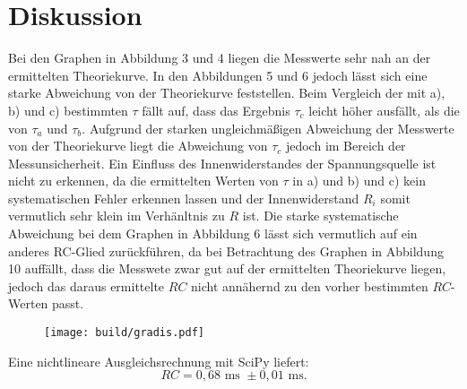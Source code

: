 \section{Diskussion}
\label{sec:Diskussion}\textbf{}
Bei den Graphen in Abbildung 3 und 4 liegen die Messwerte sehr nah an der ermittelten Theoriekurve. In den Abbildungen 5 und 6 jedoch lässt sich eine starke Abweichung von der Theoriekurve feststellen. Beim Vergleich der mit a), b) und c) bestimmten $\tau$ fällt auf, dass das Ergebnis $\tau_c$ leicht höher ausfällt, als die von $\tau_a$ und $\tau_b$. Aufgrund der starken ungleichmäßigen Abweichung der Messwerte von der Theoriekurve liegt die Abweichung von $\tau_c$ jedoch im Bereich der Messunsicherheit. Ein Einfluss des Innenwiderstandes der Spannungsquelle ist nicht zu erkennen, da die ermittelten Werten von $\tau$ in a) und b) und c) kein systematischen Fehler erkennen lassen und der Innenwiderstand $R_i$ somit vermutlich sehr klein im Verhänltnis zu $R$ ist. Die starke systematische Abweichung bei dem Graphen in Abbildung 6 lässt sich vermutlich auf ein anderes RC-Glied zurückführen, da bei Betrachtung des Graphen in Abbildung 10 auffällt, dass die Messwete zwar gut auf der ermittelten Theoriekurve liegen, jedoch das daraus ermittelte $RC$ nicht annähernd zu den vorher bestimmten $RC$-Werten passt.
\begin{figure}[H]
	\centering
	\caption{}
	\texttt{[image: build/gradis.pdf]}
	\label{fig:Dis}
\end{figure}
Eine nichtlineare Ausgleichsrechnung mit SciPy \cite{scipy} liefert:
\begin{displaymath}
RC=0,68 \text{ ms } \pm 0,01 \text{ ms.}
\end{displaymath}






	
